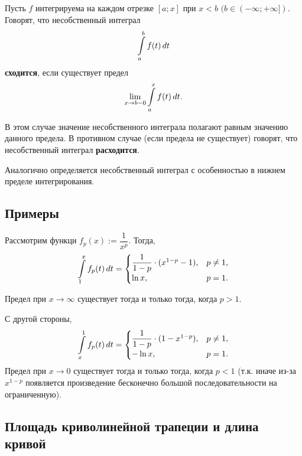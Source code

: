 \documentclass[a4paper]{article}
\theoremstyle{named}
\renewcommand{\int}{\intop}
\begin{document}
    	\begin{definition*}
    		Пусть $f$ интегрируема на каждом отрезке $[a; x]$ при $x < b$ $(b \in (-\infty; +\infty])$.
    		Говорят, что несобственный интеграл
    		\begin{equation*}
    			\int_a^b f(t) \dd t
    		\end{equation*}
    		\textbf{сходится}, если существует предел
    		\begin{equation*}
    			\lim_{x \to b - 0} \int_a^x f(t) \dd t.
    		\end{equation*}

    		В этом случае значение несобственного интеграла полагают равным значению данного предела. В противном случае (если предела не существует) говорят, что несобственный интеграл \textbf{расходится}.

    		Аналогично определяется несобственный интеграл с особенностью в нижнем пределе интегрирования.
    	\end{definition*}

    	\subsection{Примеры}

    	Рассмотрим функци $f_p(x) := \dfrac{1}{x^p}$. Тогда,
    	\begin{equation*}
    		\int_1^x f_p(t) \dd t = \begin{cases}
    			\dfrac{1}{1 - p} \cdot (x^{1 - p} - 1), &p \neq 1, \\
    			\ln x, &p = 1.
    		\end{cases}
    	\end{equation*}

    	Предел при $x \to \infty$ существует тогда и только тогда, когда $p > 1$.

    	С другой стороны,
    	\begin{equation*}
    		\int_x^1 f_p(t) \dd t = \begin{cases}
    			\dfrac{1}{1 - p} \cdot (1 - x^{1 - p}), &p \neq 1, \\
    			-\ln x, &p = 1.
    		\end{cases}
    	\end{equation*}
    	Предел при $x \to 0$ существует тогда и только тогда, когда $p < 1$ (т.к. иначе из-за $x^{1 - p}$ появляется произведение бесконечно большой последовательности на ограниченную).

    	\subsection{Площадь криволинейной трапеции и длина кривой}
\end{document}
